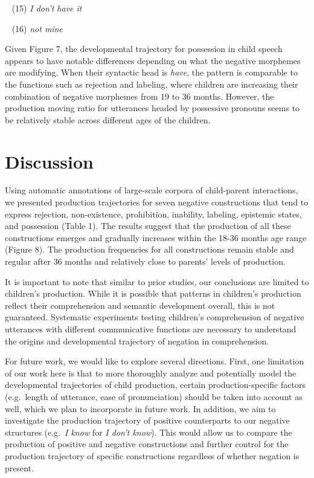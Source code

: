 \documentclass[10pt, letterpaper]{article}
\begin{document}
~ (15) \emph{I don't have it}

~ (16) \emph{not mine}

Given Figure 7, the developmental trajectory for possession in child
speech appears to have notable differences depending on what the
negative morphemes are modifying. When their syntactic head is
\emph{have}, the pattern is comparable to the functions such as
rejection and labeling, where children are increasing their combination
of negative morphemes from 19 to 36 months. However, the production
moving ratio for utterances headed by possessive pronouns seems to be
relatively stable across different ages of the children.

\hypertarget{discussion}{%
\section{Discussion}\label{discussion}}

Using automatic annotations of large-scale corpora of child-parent
interactions, we presented production trajectories for seven negative
constructions that tend to express rejection, non-existence,
prohibition, inability, labeling, epistemic states, and possession
(Table 1). The results suggest that the production of all these
constructions emerges and gradually increases within the 18-36 months
age range (Figure 8). The production frequencies for all constructions
remain stable and regular after 36 months and relatively close to
parents' levels of production.

It is important to note that similar to prior studies, our conclusions
are limited to children's production. While it is possible that patterns
in children's production reflect their comprehension and semantic
development overall, this is not guaranteed. Systematic experiments
testing children's comprehension of negative utterances with different
communicative functions are necessary to understand the origins and
developmental trajectory of negation in comprehension.

For future work, we would like to explore several directions. First, one
limitation of our work here is that to more thoroughly analyze and
potentially model the developmental trajectories of child production,
certain production-specific factors (e.g.~length of utterance, ease of
pronunciation) should be taken into account as well, which we plan to
incorporate in future work. In addition, we aim to investigate the
production trajectory of positive counterparts to our negative
structures (e.g.~\emph{I know} for \emph{I don't know}). This would
allow us to compare the production of positive and negative
constructions and further control for the production trajectory of
specific constructions regardless of whether negation is present.
\end{document}

